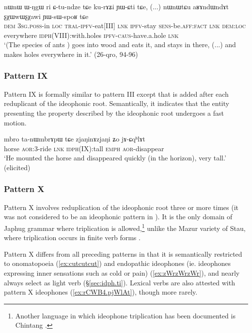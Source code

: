 \begin{exe} 
\ex \label{ex:sxXwwWsxWawi}
\gll nɯnɯ ɯ-ŋgɯ ri ɕ-tu-ndze tɕe ku-rɤʑi ɲɯ-ɕti tɕe, (...) nɯnɯtɕu aʁɤndɯndɤt ʂχɯwɯʂχawi ɲɯ-sɯ-spoʁ tɕe \\
\textsc{dem} \textsc{3sg}.\textsc{poss}-in \textsc{loc} \textsc{tral}-\textsc{ipfv}-eat[III] \textsc{lnk} \textsc{ipfv}-stay \textsc{sens}-be.\textsc{aff}:\textsc{fact} \textsc{lnk} {  } \textsc{dem}:\textsc{loc} everywhere \textsc{idph}(VIII):with.holes \textsc{ipfv}-\textsc{caus}-have.a.hole \textsc{lnk} \\
\glt `(The species of ants ) goes into wood and eats it, and stays in there, (...) and makes holes everywhere in it.' (26-qro, 94-96)
\end{exe} 

\subsubsection{Pattern IX} \label{sec:ideo.IX}
Pattern IX is formally similar to pattern III except that  is added after each reduplicant of the ideophonic root. Semantically, it indicates that the entity presenting the property described by the ideophonic root undergoes a fast motion.

\begin{exe} 
\ex  \label{ex:ideo9}
\gll  mbro ta-nɯmbrɤpɯ tɕe zjaŋinɤzjaŋi ʑo jɤ-ɕqʰlɤt   \\
horse \textsc{aor}:3\flobv{}-ride \textsc{lnk} \textsc{idph}(IX):tall \textsc{emph} \textsc{aor}-disappear \\
\glt `He mounted the horse and disappeared quickly (in the horizon), very tall.'  (elicited)
 \end{exe}

 
\subsubsection{Pattern X} \label{sec:ideo.X}
Pattern X involves reduplication of the ideophonic root three or more times (it was not considered to be an ideophonic pattern in \citealt{japhug14ideophones}). It is the only domain of Japhug grammar where triplication is allowed,\footnote{Another language in which ideophone triplication has been documented is Chintang \citep{rai06triplication}.
} unlike the Mazur variety of Stau, where triplication occurs in finite verb forms \citep{gates17triplication}.

Pattern X differs from all preceding patterns in that it is semantically restricted to onomatopoeia (\ref{ex:cutcutcut}) and endopathic ideophones (ie. ideophones expressing inner sensations such as cold or pain) (\ref{ex:zWrzWrzWr}), and nearly always select  as light verb (§\ref{sec:idph.ti}). Lexical verbs are also attested with pattern X ideophones (\ref{ex:rCWB4.pjWlAt}), though more rarely.
 
